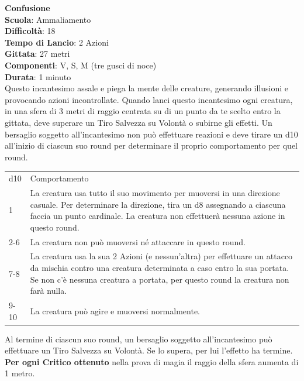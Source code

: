 \begin{multicols}{2}
\medskip\textbf{Confusione}\\
\textbf{Scuola}: Ammaliamento\\
\textbf{Difficoltà}: 18\\
\textbf{Tempo di Lancio}: 2 Azioni\\
\textbf{Gittata}: 27 metri\\
\textbf{Componenti}: V, S, M (tre gusci di noce)\\
\textbf{Durata}: 1 minuto\\
Questo incantesimo assale e piega la mente delle creature, generando illusioni e provocando azioni incontrollate. Quando lanci questo incantesimo ogni creatura, in una sfera di 3 metri di raggio centrata su di un punto da te scelto entro la gittata, deve superare un Tiro Salvezza su Volontà o subirne gli effetti. Un bersaglio soggetto all'incantesimo non può effettuare reazioni e deve tirare un d10 all'inizio di ciascun suo round per determinare il proprio comportamento per quel round. 

\medskip

\begin{tabularx}{0.45\textwidth}{lX}
	\hline 
d10 & Comportamento\\ 
1 & La creatura usa tutto il suo movimento per muoversi in una direzione casuale. Per determinare la direzione, tira un d8 assegnando a ciascuna faccia un punto cardinale. La
creatura non effettuerà nessuna azione in questo round. \\
2-6 & La creatura non può muoversi né attaccare in questo round.\\
7-8 & La creatura usa la sua 2 Azioni (e nessun'altra) per effettuare un attacco da mischia contro una creatura determinata a caso entro la sua portata. Se non c'è nessuna creatura a portata, per questo round la creatura non farà nulla.\\
9-10 & La creatura può agire e muoversi normalmente.\\
\end{tabularx} 

\medskip

Al termine di ciascun suo round, un bersaglio soggetto all'incantesimo può effettuare un Tiro Salvezza su Volontà. Se lo supera, per lui l'effetto ha termine. \\
\textbf{Per ogni Critico ottenuto} nella prova di magia il raggio della sfera aumenta di 1 metro.


\end{multicols}
